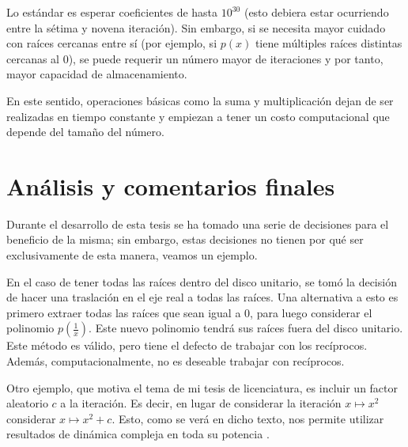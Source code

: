 \documentclass[oneside,11pt]{book}
\theoremstyle{definition}
\theoremstyle{plain}
\theoremstyle{remark}
\begin{document}
Lo est\'andar es esperar coeficientes de hasta $10^{30}$ (esto debiera estar ocurriendo entre la s\'etima y novena iteraci\'on). 
Sin embargo, si se necesita mayor cuidado con ra\'ices cercanas entre s\'i 
(por ejemplo, si $p(x)$ tiene m\'ultiples ra\'ices distintas cercanas al $0$), 
se puede requerir un n\'umero mayor de iteraciones y por tanto, mayor capacidad de almacenamiento.

En este sentido, operaciones b\'asicas como la suma y multiplicaci\'on dejan de ser realizadas en tiempo constante y empiezan a tener un costo computacional que depende del tamaño del n\'umero.

\chapter{An\'alisis y comentarios finales}

Durante el desarrollo de esta tesis se ha tomado una serie de decisiones para el beneficio de la misma;
sin embargo, 
estas decisiones no tienen por qu\'e ser exclusivamente de esta manera,
veamos un ejemplo.

En el caso de tener todas las ra\'ices dentro del disco unitario, 
se tom\'o la decisi\'on de hacer una traslaci\'on en el eje real a todas las ra\'ices.
Una alternativa a esto es primero extraer todas las ra\'ices que sean igual a $0$, 
para luego considerar el polinomio $p(\frac{1}{x})$. 
Este nuevo polinomio tendr\'a sus ra\'ices fuera del disco unitario.
Este m\'etodo es v\'alido, pero tiene el defecto de trabajar con los rec\'iprocos.
Adem\'as, computacionalmente, no es deseable trabajar con rec\'iprocos.

Otro ejemplo, que motiva el tema de mi tesis de licenciatura, es incluir un factor aleatorio $c$ a la iteraci\'on. 
Es decir, en lugar de considerar la iteraci\'on $x\mapsto x^2$ considerar $x\mapsto x^2+c$.
Esto, como se ver\'a en dicho texto, nos permite utilizar resultados de din\'amica compleja en toda su potencia \cite{Torres}.

\printbibliography
\end{document}
